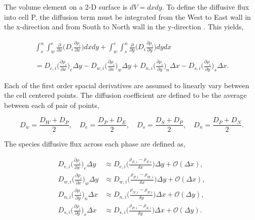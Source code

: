\noindent The volume element on a 2-D surface is $dV = dxdy$. To define the diffusive flux into cell P, the diffusion term must be integrated from the West to East wall in the x-direction and from South to North wall in the y-direction \cite{versteeg2007}. This yields,

\begin{equation}
\begin{split}
    \int_{s}^{n}\int_{w}^{e}\frac{\partial }{\partial x}\bigg( D_{i}\frac{\partial \rho_{i}}{\partial x}\bigg)dxdy + \int_{w}^{e}\int_{s}^{n}\frac{\partial }{\partial y}\bigg( D_{i}\frac{\partial \rho_{i}}{\partial y}\bigg)dydx \\ 
    \\
    = D_{e,i}\bigg(\frac{\partial \rho_{i}}{\partial x}\bigg)_{e}\Delta y -D_{w,i}\bigg(\frac{\partial \rho_{i}}{\partial x}\bigg)_{w}\Delta y
    + D_{n,i}\bigg(\frac{\partial \rho_{i}}{\partial y}\bigg)_{n}\Delta x - D_{s,i}\bigg(\frac{\partial \rho_{i}}{\partial y}\bigg)_{s}\Delta x.
\end{split}
\end{equation}

\noindent Each of the first order spacial derivatives are assumed to linearly vary between the cell centered points. The diffusion coefficient are defined to be the average between each of pair of points,

\begin{equation}
    D_{w} =\frac{D_{W} + D_{P}}{2}, \quad D_{e} =\frac{D_{P} + D_{E}}{2}, \quad D_{s} =\frac{D_{S} + D_{P}}{2}, \quad D_{n} =\frac{D_{P} + D_{N}}{2}. 
\end{equation}

\noindent The species diffusive flux across each phase are defined as,

\begin{equation}
\begin{split}
    D_{e,i}\bigg(\frac{\partial \rho_{i}}{\partial x}\bigg)_{e}\Delta y &\approx
    D_{e,i}\bigg(\frac{\rho_{E,i} - \rho_{P,i}}{\delta x}\bigg)\Delta y +
    \mathcal{O}(\Delta x),
    \\
    D_{w,i}\bigg(\frac{\partial \rho_{i}}{\partial x}\bigg)_{w}\Delta y &\approx
    D_{w,i}\bigg(\frac{\rho_{P,i} - \rho_{W,i}}{\delta x}\bigg)\Delta y + \mathcal{O}(\Delta x),
    \\
    D_{n,i}\bigg(\frac{\partial \rho_{i}}{\partial y}\bigg)_{n}\Delta x &\approx
    D_{n,i}\bigg(\frac{\rho_{N,i} - \rho_{P,i}}{\delta y}\bigg)\Delta x +
    \mathcal{O}(\Delta y),
    \\
    D_{s,i}\bigg(\frac{\partial \rho_{i}}{\partial y}\bigg)_{s}\Delta x &\approx
    D_{s,i}\bigg(\frac{\rho_{P,i} - \rho_{S,i}}{\delta y}\bigg)\Delta x +
    \mathcal{O}(\Delta y).
\end{split}
\end{equation}

